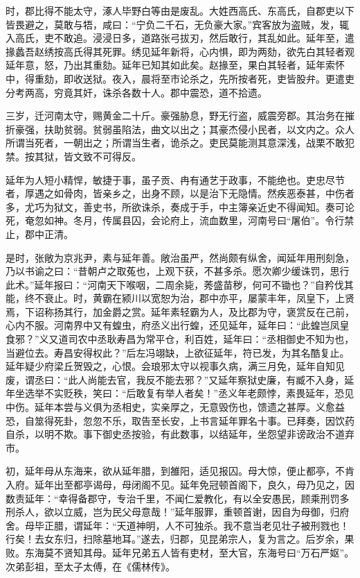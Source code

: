 \documentclass[12pt,UTF8]{ctexbook}
\begin{document}
时，郡比得不能太守，涿人毕野白等由是废乱。大姓西高氏、东高氏，自郡吏以下皆畏避之，莫敢与牾，咸曰：“宁负二千石，无负豪大家。”宾客放为盗贼，发，辄入高氏，吏不敢追。浸浸日多，道路张弓拔刃，然后敢行，其乱如此。延年至，遣掾蠡吾赵绣按高氏得其死罪。绣见延年新将，心内惧，即为两劾，欲先白其轻者观延年意，怒，乃出其重劾。延年已知其如此矣。赵掾至，果白其轻者，延年索怀中，得重劾，即收送狱。夜入，晨将至市论杀之，先所按者死，吏皆股弁。更遣吏分考两高，穷竟其奸，诛杀各数十人。郡中震恐，道不拾遗。



三岁，迁河南太守，赐黄金二十斤。豪强胁息，野无行盗，威震旁郡。其治务在摧折豪强，扶助贫弱。贫弱虽陷法，曲文以出之；其豪杰侵小民者，以文内之。众人所谓当死者，一朝出之；所谓当生者，诡杀之。吏民莫能测其意深浅，战栗不敢犯禁。按其狱，皆文致不可得反。



延年为人短小精悍，敏捷于事，虽子贡、冉有通艺于政事，不能绝也。吏忠尽节者，厚遇之如骨肉，皆亲乡之，出身不顾，以是治下无隐情。然疾恶泰甚，中伤者多，尤巧为狱文，善史书，所欲诛杀，奏成于手，中主簿亲近史不得闻知。奏可论死，奄忽如神。冬月，传属县囚，会论府上，流血数里，河南号曰“屠伯”。令行禁止，郡中正清。



是时，张敞为京兆尹，素与延年善。敞治虽严，然尚颇有纵舍，闻延年用刑刻急，乃以书谕之曰：“昔朝卢之取菟也，上观下获，不甚多杀。愿次卿少缓诛罚，思行此术。”延年报曰：“河南天下喉咽，二周余毙，莠盛苗秽，何可不锄也？”自矜伐其能，终不衰止。时，黄霸在颍川以宽恕为治，郡中亦平，屡蒙丰年，凤皇下，上贤焉，下诏称扬其行，加金爵之赏。延年素轻霸为人，及比郡为守，褒赏反在己前，心内不服。河南界中又有蝗虫，府丞义出行蝗，还见延年，延年曰：“此蝗岂凤皇食邪？”义又道司农中丞耿寿昌为常平仓，利百姓，延年曰：“丞相御史不知为也，当避位去。寿昌安得权此？”后左冯翊缺，上欲征延年，符已发，为其名酷复止。延年疑少府梁丘贺毁之，心恨。会琅邪太守以视事久病，满三月免，延年自知见废，谓丞曰：“此人尚能去官，我反不能去邪？”又延年察狱史廉，有臧不入身，延年坐选举不实贬秩，笑曰：“后敢复有举人者矣！”丞义年老颇悖，素畏延年，恐见中伤。延年本尝与义俱为丞相史，实亲厚之，无意毁伤也，馈遗之甚厚。义愈益恐，自筮得死卦，忽忽不乐，取告至长安，上书言延年罪名十事。已拜奏，因饮药自杀，以明不欺。事下御史丞按验，有此数事，以结延年，坐怨望非谤政治不道弃市。



初，延年母从东海来，欲从延年腊，到雒阳，适见报囚。母大惊，便止都亭，不肯入府。延年出至都亭谒母，母闭阁不见。延年免冠顿首阁下，良久，母乃见之，因数责延年：“幸得备郡守，专治千里，不闻仁爱教化，有以全安愚民，顾乘刑罚多刑杀人，欲以立威，岂为民父母意哉！”延年服罪，重顿首谢，因自为母御，归府舍。母毕正腊，谓延年：“天道神明，人不可独杀。我不意当老见壮子被刑戮也！行矣！去女东归，扫除墓地耳。”遂去，归郡，见昆弟宗人，复为言之。后岁余，果败。东海莫不贤知其母。延年兄弟五人皆有吏材，至大官，东海号曰“万石严妪”。次弟彭祖，至太子太傅，在《儒林传》。
\end{document}
